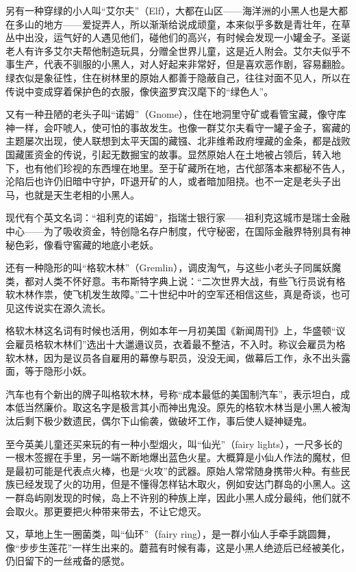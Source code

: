 \par 另有一种穿绿的小人叫“艾尔夫”（Elf），大都在山区——海洋洲的小黑人也是大都在多山的地方——爱捉弄人，所以渐渐给说成顽童，本来似乎多数是青壮年，在草丛中出没，运气好的人遇见他们，碰他们的高兴，有时候会发现一小罐金子。圣诞老人有许多艾尔夫帮他制造玩具，分赠全世界儿童，这是近人附会。艾尔夫似乎不事生产，代表不驯服的小黑人，对人好起来非常好，但是喜欢恶作剧，容易翻脸。绿衣似是象征性，住在树林里的原始人都善于隐蔽自己，往往对面不见人，所以在传说中变成穿着保护色的衣服，像侠盗罗宾汉麾下的“绿色人”。
\par 又有一种丑陋的老头子叫“诺姆”（Gnome），住在地洞里守矿或看管宝藏，像守库神一样，会吓唬人，使可怕的事故发生。也像一群艾尔夫看守一罐子金子，窖藏的主题屡次出现，使人联想到太平天国的藏镪、北非维希政府埋藏的金条，都是战败国藏匿资金的传说，引起无数掘宝的故事。显然原始人在土地被占领后，转入地下，也有他们珍视的东西埋在地里。至于矿藏所在地，古代部落本来都秘不告人，沦陷后也许仍旧暗中守护，吓退开矿的人，或者暗加阻挠。也不一定是老头子出马，也就是天生老相的小黑人。
\par 现代有个英文名词：“祖利克的诺姆”，指瑞士银行家——祖利克这城市是瑞士金融中心——为了吸收资金，特创隐名存户制度，代守秘密，在国际金融界特别具有神秘色彩，像看守窖藏的地底小老妖。
\par 还有一种隐形的叫“格软木林”（Gremlin），调皮淘气，与这些小老头子同属妖魔类，都对人类不怀好意。韦布斯特字典上说：“二次世界大战，有些飞行员说有格软木林作祟，使飞机发生故障。”二十世纪中叶的空军还相信这些，真是奇谈，也可见这传说实在源久流长。
\par 格软木林这名词有时候也活用，例如本年一月初美国《新闻周刊》上，华盛顿“议会雇员格软木林们”选出十大邋遢议员，衣着最不整洁，不入时。称议会雇员为格软木林，因为是议员各自雇用的幕僚与职员，没没无闻，做幕后工作，永不出头露面，等于隐形小妖。
\par 汽车也有个新出的牌子叫格软木林，号称“成本最低的美国制汽车”，表示坦白，成本低当然廉价。取这名字是极言其小而神出鬼没。原先的格软木林当是小黑人被淘汰后剩下极少数遗民，偶尔下山偷袭，做破坏工作，事后使人疑神疑鬼。
\par 至今英美儿童还买来玩的有一种小型烟火，叫“仙光”（fairy lights），一尺多长的一根木签握在手里，另一端不断地爆出蓝色火星。大概算是小仙人作法的魔杖，但是最初可能是代表点火棒，也是“火攻”的武器。原始人常常随身携带火种。有些民族已经发现了火的功用，但是不懂得怎样钻木取火，例如安达门群岛的小黑人。这一群岛屿刚发现的时候，岛上不许别的种族上岸，因此小黑人成分最纯，他们就不会取火。那更要把火种带来带去，不让它熄灭。
\par 又，草地上生一圈菌类，叫“仙环”（fairy ring），是一群小仙人手牵手跳圆舞，像“步步生莲花”一样生出来的。蘑菰有时候有毒，这是小黑人绝迹后已经被美化，仍旧留下的一丝戒备的感觉。
